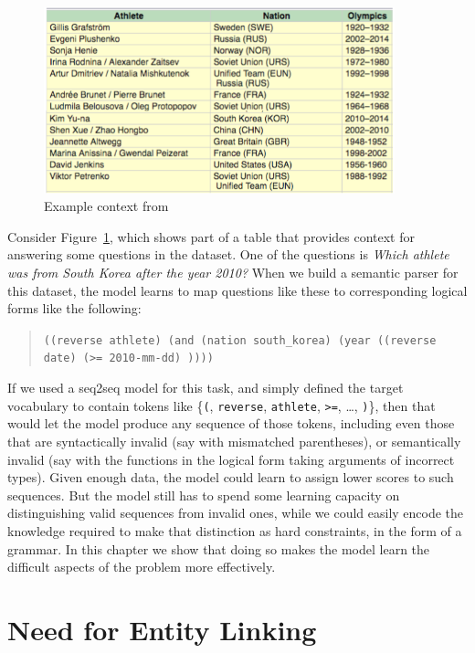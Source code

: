 \begin{figure}
	\begin{center}
		\includegraphics[width=4in]{figures/wikitables_example2.png}
		\caption{Example context from
		\WTQ~\citep{pasupat2015compositional}}\label{fig:wikitables_reasoning_example}
	\end{center}
\end{figure}
Consider
Figure~\ref{fig:wikitables_reasoning_example}, which shows part of a table that
provides context for answering some questions in the \WTQ dataset. One of the
questions is \textit{Which athlete was from South Korea after the year 2010?}
When we build a semantic parser for this dataset, the model learns to map
questions like these to corresponding logical forms like the following:
\begin{quote}
	\texttt{((reverse athlete) (and (nation south\_korea) (year ((reverse
	date) (>= 2010-mm-dd) ))))}
\end{quote}
If we used a seq2seq model for this task, and simply defined the target
vocabulary to contain tokens like \{\texttt{(}, \texttt{reverse},
\texttt{athlete}, \texttt{>=}, \ldots, \texttt{)}\}, then that would let the
model produce any sequence of those tokens, including even those that are
syntactically invalid (say with mismatched parentheses), or semantically invalid
(say with the functions in the logical form taking arguments of incorrect
types). Given enough data, the model could learn to assign lower scores to such
sequences. But the model still has to spend some learning capacity on
distinguishing valid sequences from invalid ones, while we could easily encode
the knowledge required to make that distinction as hard constraints, in the form
of a grammar. In this chapter we show that doing so makes the model learn the
difficult aspects of the problem more effectively.

\section{Need for Entity Linking}



